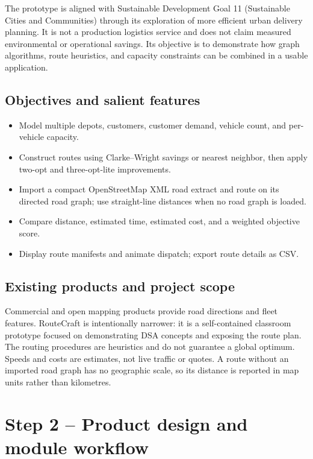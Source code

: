 \documentclass[11pt,a4paper]{article}
\begin{document}
The prototype is aligned with Sustainable Development Goal 11 (Sustainable
Cities and Communities) through its exploration of more efficient urban
delivery planning. It is not a production logistics service and does not claim
measured environmental or operational savings. Its objective is to demonstrate
how graph algorithms, route heuristics, and capacity constraints can be
combined in a usable application.

\subsection{Objectives and salient features}
\begin{itemize}
    \item Model multiple depots, customers, customer demand, vehicle count,
          and per-vehicle capacity.
    \item Construct routes using Clarke--Wright savings or nearest neighbor,
          then apply two-opt and three-opt-lite improvements.
    \item Import a compact OpenStreetMap XML road extract and route on its
          directed road graph; use straight-line distances when no road graph
          is loaded.
    \item Compare distance, estimated time, estimated cost, and a weighted
          objective score.
    \item Display route manifests and animate dispatch; export route details
          as CSV.
\end{itemize}

\subsection{Existing products and project scope}
Commercial and open mapping products provide road directions and fleet
features. RouteCraft is intentionally narrower: it is a self-contained
classroom prototype focused on demonstrating DSA concepts and exposing the
route plan. The routing procedures are heuristics and do not guarantee a
global optimum. Speeds and costs are estimates, not live traffic or quotes. A route without
an imported road graph has no geographic scale, so its distance is reported
in map units rather than kilometres.

\section{Step 2 -- Product design and module workflow}
\end{document}
